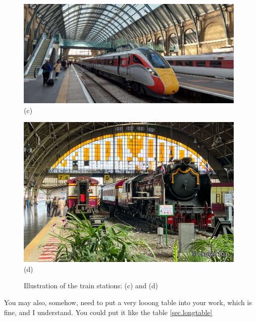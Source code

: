 \begin{Chapter}
\begin{figure}[ht]
    \centering
    \begin{minipage}{\linewidth}
        \centering
        \includegraphics[width=\linewidth]{pics/train-station3.jpg}
        \vspace{0.5ex}
        \small (c)
    \end{minipage}
    \vspace{0.5em}
    
    \begin{minipage}{\linewidth}
        \centering
        \includegraphics[width=\linewidth]{pics/train-station4.jpg}
        \vspace{0.5ex}
        \small (d)
    \end{minipage}
    \caption{Illustration of the train stations: (c) and (d)}
    \label{fig2-cont}
\end{figure}

You may also, somehow, need to put a very looong table into your work, which is fine, and I understand. You could put it like the table \ref{sec.longtable}


\end{Chapter}
